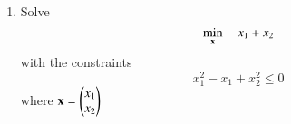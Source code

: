
\begin{enumerate}[label=\thesection.\arabic*,ref=\thesection.\theenumi]


		\item
	\label{convex_sdp_eqiv}
	Solve
	\begin{equation}
	\min_{\mathbf{x}} \quad x_1 + x_2
	\end{equation}
	with the constraints
	\begin{equation}
	x_1^2 - x_1 + x_2^2 \leq 0
	\end{equation}
where 
$
\mathbf{x} = \begin{pmatrix}
x_1 \\
x_2
\end{pmatrix}
$

%
%
%	


\end{enumerate}
